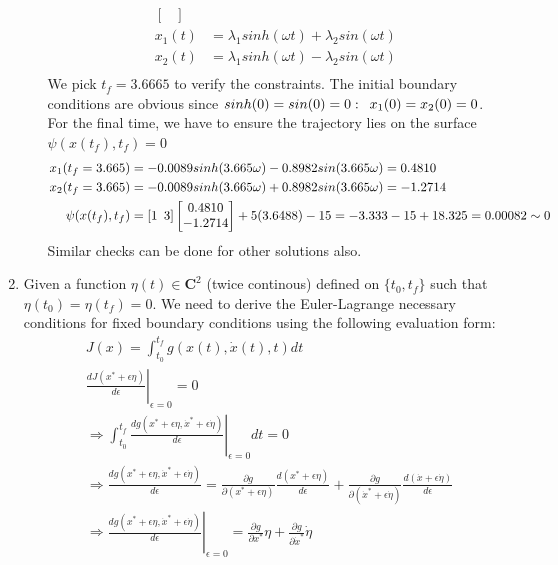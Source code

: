\begin{enumerate}
\begin{enumerate}
\begin{align*}
\begin{bmatrix}
  \end{bmatrix}\\
 x_1(t) &= \lambda_1 sinh(\omega t) + \lambda_2 sin(\omega t) \\
 x_2(t) &= \lambda_1 sinh(\omega t) - \lambda_2 sin(\omega t) \\
\end{align*}
We pick $t_f = 3.6665$ to verify the constraints. The initial boundary conditions are obvious since $sinh(0) = sin(0) = 0:\enskip x_1(0) = x_2(0) = 0$. For the final time, we have to ensure the 
trajectory lies on the surface $\psi(x(t_f),t_f) = 0$
\begin{align*}
x_1(t_f = 3.665) &= -0.0089 sinh(3.665\omega) -0.8982 sin(3.665\omega) = 0.4810\\
x_2(t_f = 3.665) &= -0.0089 sinh(3.665\omega) +0.8982 sin(3.665\omega) =-1.2714 \\
\psi(x(t_f),t_f) &= [1\enskip 3] \begin{bmatrix}
                           0.4810 \\
                           -1.2714
                          \end{bmatrix} + 5(3.6488) - 15 = -3.333 -15 + 18.325 = 0.00082 \sim 0 
\end{align*}
Similar checks can be done for other solutions also.
  \end{enumerate}
  \newpage
  \item Given a function $\eta(t) \in \mathbf{C}^2$ (twice continous) defined on $\{t_0, t_f\}$ such that $\eta(t_0) = \eta(t_f) = 0$. We need to derive the Euler-Lagrange necessary conditions for fixed boundary conditions using the following evaluation form:
  \begin{align*}
   &J(x) = \int_{t_0}^{t_f} g(x(t), \dot x(t), t) dt \\
   &\left.\frac{d J(x^* + \epsilon \eta) }{d \epsilon} \right|_{\epsilon = 0} = 0 \\[5pt]
   &\Rightarrow \int_{t_0}^{t_f} \left.\frac{d g(x^* + \epsilon \eta, {\dot x}^* + \epsilon \dot \eta)}{d \epsilon}\right|_{\epsilon = 0} dt = 0\\
   &\Rightarrow \frac{dg(x^* + \epsilon \eta,{\dot x}^* + \epsilon \dot \eta)}{d \epsilon} = \frac{\partial g}{\partial (x^* + \epsilon \eta)} \frac{d(x^* + \epsilon \eta)}{d\epsilon} + \frac{\partial g}{\partial (\dot x^* + \epsilon \dot \eta)} \frac{d(\dot x + \epsilon \dot \eta)}{d\epsilon}\\
   &\Rightarrow  \left. \frac{dg(x^* + \epsilon \eta,{\dot x}^* + \epsilon \dot \eta)}{d \epsilon}\right|_{\epsilon = 0} = \frac{\partial g}{\partial x^* } \eta + \frac{\partial g}{\partial \dot x^*} \dot \eta\\

\end{align*}
\end{enumerate}
